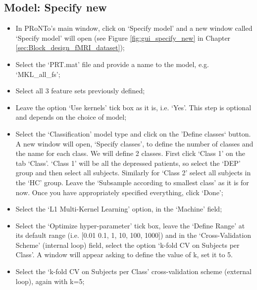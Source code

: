 
\subsection{Model: Specify new}

\begin{itemize}
	
	\item In PRoNTo's main window, click on `Specify model' and a new window called `Specify model' will open (see Figure \ref{fig:gui_specify_new} in Chapter \ref{sec:Block_design_fMRI_dataset});
	
	\item Select the `PRT.mat' file and provide a name to the model, e.g. `MKL\_all\_fs';

	\item Select all 3 feature sets previously defined;

	\item Leave the option `Use kernels' tick box as it is, i.e. `Yes'. This step is optional and depends on the choice of model;

	\item	Select the `Classification' model type and click on the 'Define classes` button. A new window will open, `Specify classes', to define the number of classes and the name for each class. We will define 2 classes. First click `Class 1' on the tab `Class'. `Class 1' will be all the depressed patients, so select the `DEP' group and then select all subjects. Similarly for `Class 2' select all subjects in the `HC' group. Leave the `Subsample according to smallest class' as it is for now. Once you have appropriately specified everything, click `Done';
	
	\item Select the `L1 Multi-Kernel Learning' option, in the `Machine' field;
	
	\item Select the `Optimize hyper-parameter' tick box, leave the `Define Range' at its default range (i.e. [0.01 0.1, 1, 10, 100, 1000]) and in the `Cross-Validation Scheme' (internal loop) field, select the option `k-fold CV on Subjects per Class'. A window will appear asking to define the value of k, set it to 5.
		
	\item Select the `k-fold CV on Subjects per Class' cross-validation scheme (external loop), again with k=5; 
	

\end{itemize}
